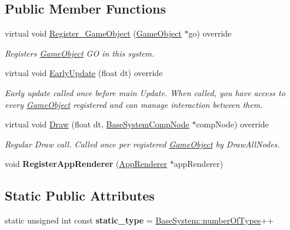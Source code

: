 \subsection*{Public Member Functions}
\begin{DoxyCompactItemize}
\item 
virtual void \hyperlink{classUISystem_a24d58ab299fd47c10948230793ff135c}{Register\+\_\+\+Game\+Object} (\hyperlink{classGameObject}{Game\+Object} $\ast$go) override
\begin{DoxyCompactList}\small\item\em Registers \hyperlink{classGameObject}{Game\+Object} GO in this system. \end{DoxyCompactList}\item 
virtual void \hyperlink{classUISystem_ac7e49ca17db397a2321a8b89dbc5bd47}{Early\+Update} (float dt) override
\begin{DoxyCompactList}\small\item\em Early update called once before main Update. When called, you have access to every \hyperlink{classGameObject}{Game\+Object} registered and can manage interaction between them. \end{DoxyCompactList}\item 
\mbox{\label{classUISystem_a898a6c2d363122cc62cfdb1516b2f792}} 
virtual void \hyperlink{classUISystem_a898a6c2d363122cc62cfdb1516b2f792}{Draw} (float dt, \hyperlink{structBaseSystemCompNode}{Base\+System\+Comp\+Node} $\ast$comp\+Node) override
\begin{DoxyCompactList}\small\item\em Regular Draw call. Called once per registered \hyperlink{classGameObject}{Game\+Object} by Draw\+All\+Nodes. \end{DoxyCompactList}\item 
\mbox{\label{classUISystem_a1b42bb2b9d953c402826eb9aa93cbed5}} 
void {\bfseries Register\+App\+Renderer} (\hyperlink{classAppRenderer}{App\+Renderer} $\ast$app\+Renderer)
\end{DoxyCompactItemize}
\subsection*{Static Public Attributes}
\begin{DoxyCompactItemize}
\item 
\mbox{\label{classUISystem_acd7560147af6e4ff8393309b0e7ac0aa}} 
static unsigned int const {\bfseries static\+\_\+type} = \hyperlink{classBaseSystem_a7ef356edab3cfb02905e0a73a645b131}{Base\+System\+::number\+Of\+Types}++
\end{DoxyCompactItemize}
